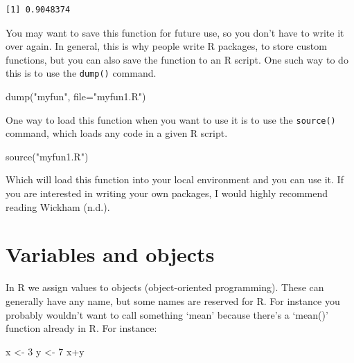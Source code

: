 \documentclass[
  letterpaper,
  DIV=11,
  numbers=noendperiod]{scrreprt}
\newenvironment{Shaded}{\begin{snugshade}}{\end{snugshade}}
\newcommand{\AttributeTok}[1]{\textcolor[rgb]{0.40,0.45,0.13}{#1}}
\newcommand{\DecValTok}[1]{\textcolor[rgb]{0.68,0.00,0.00}{#1}}
\newcommand{\FunctionTok}[1]{\textcolor[rgb]{0.28,0.35,0.67}{#1}}
\newcommand{\NormalTok}[1]{\textcolor[rgb]{0.00,0.23,0.31}{#1}}
\newcommand{\OtherTok}[1]{\textcolor[rgb]{0.00,0.23,0.31}{#1}}
\newcommand{\SpecialCharTok}[1]{\textcolor[rgb]{0.37,0.37,0.37}{#1}}
\newcommand{\StringTok}[1]{\textcolor[rgb]{0.13,0.47,0.30}{#1}}
\begin{document}
\begin{verbatim}
[1] 0.9048374
\end{verbatim}

You may want to save this function for future use, so you don't have to
write it over again. In general, this is why people write R packages, to
store custom functions, but you can also save the function to an R
script. One such way to do this is to use the \texttt{dump()} command.

\begin{Shaded}
\begin{Highlighting}[]
\FunctionTok{dump}\NormalTok{(}\StringTok{"myfun"}\NormalTok{, }
     \AttributeTok{file=}\StringTok{"myfun1.R"}\NormalTok{)}
\end{Highlighting}
\end{Shaded}

One way to load this function when you want to use it is to use the
\texttt{source()} command, which loads any code in a given R script.

\begin{Shaded}
\begin{Highlighting}[]
\FunctionTok{source}\NormalTok{(}\StringTok{"myfun1.R"}\NormalTok{)}
\end{Highlighting}
\end{Shaded}

Which will load this function into your local environment and you can
use it. If you are interested in writing your own packages, I would
highly recommend reading Wickham (n.d.).

\hypertarget{variables-and-objects}{%
\section{Variables and objects}\label{variables-and-objects}}

In R we assign values to objects (object-oriented programming). These
can generally have any name, but some names are reserved for R. For
instance you probably wouldn't want to call something `mean' because
there's a `mean()' function already in R. For instance:

\begin{Shaded}
\begin{Highlighting}[]
\NormalTok{x }\OtherTok{\textless{}{-}} \DecValTok{3}
\NormalTok{y }\OtherTok{\textless{}{-}} \DecValTok{7}
\NormalTok{x}\SpecialCharTok{+}\NormalTok{y}
\end{Highlighting}
\end{Shaded}
\end{document}
